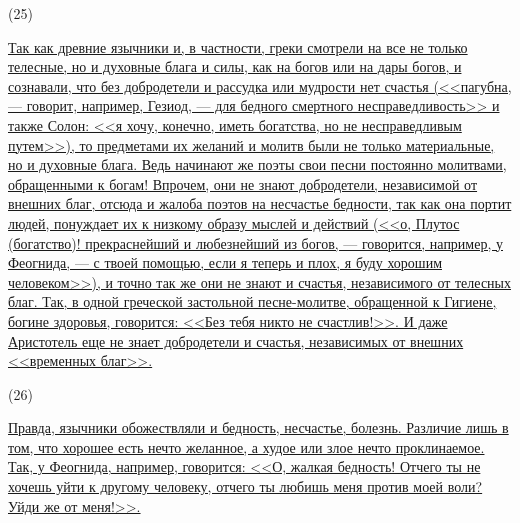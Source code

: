 \documentclass[12pt]{article}
\begin{document}
\hypertarget{25}{(25)} \hyperlink{b25}{Так как древние язычники и, в частности, греки смотрели на все не только телесные, но и духовные блага и силы, как на богов или на дары богов, и сознавали, что без добродетели и рассудка или мудрости нет счастья (<<пагубна, --- говорит, например, Гезиод, --- для бедного смертного несправедливость>>  и также Солон: <<я хочу, конечно, иметь богатства, но не несправедливым путем>>), то предметами их желаний и молитв были не только материальные, но и духовные блага. Ведь начинают же поэты свои песни постоянно молитвами, обращенными к богам! Впрочем, они не знают добродетели, независимой от внешних благ, отсюда и жалоба поэтов на несчастье бедности, так как она портит людей, понуждает их к низкому образу мыслей и действий (<<о, Плутос (богатство)! прекраснейший и любезнейший из богов, --- говорится, например, у Феогнида, --- с твоей помощью, если я теперь и плох, я буду хорошим человеком>>), и точно так же они не знают и счастья, независимого от телесных благ. Так, в одной греческой застольной песне-молитве, обращенной к Гигиене, богине здоровья, говорится: <<Без тебя никто не счастлив!>>. И даже Аристотель еще не знает добродетели и счастья, независимых от внешних <<временных благ>>.}

\hypertarget{26}{(26)} \hyperlink{b26}{Правда, язычники обожествляли и бедность, несчастье, болезнь. Различие лишь в том, что хорошее есть нечто желанное, а худое или злое нечто проклинаемое. Так, у Феогнида, например, говорится: <<О, жалкая бедность! Отчего ты не хочешь уйти к другому человеку, отчего ты любишь меня против моей воли? Уйди же от меня!>>.}
\end{document}

